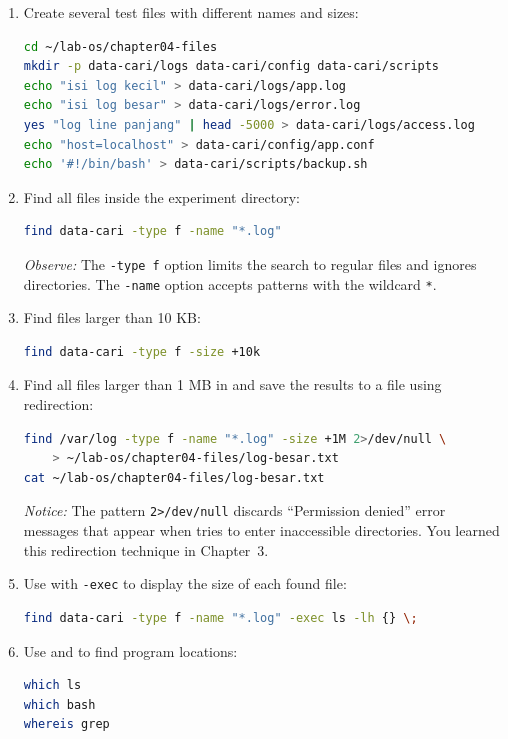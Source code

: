 \begin{enumerate}
    \item Create several test files with different names and sizes:
\begin{lstlisting}[language=bash, caption={Creating test files for search}]
cd ~/lab-os/chapter04-files
mkdir -p data-cari/logs data-cari/config data-cari/scripts
echo "isi log kecil" > data-cari/logs/app.log
echo "isi log besar" > data-cari/logs/error.log
yes "log line panjang" | head -5000 > data-cari/logs/access.log
echo "host=localhost" > data-cari/config/app.conf
echo '#!/bin/bash' > data-cari/scripts/backup.sh
\end{lstlisting}

    \item Find all  files inside the experiment directory:
\begin{lstlisting}[language=bash, caption={Searching for files by name}]
find data-cari -type f -name "*.log"
\end{lstlisting}
    \textit{Observe:} The \texttt{-type f} option limits the search to regular files and ignores directories. The \texttt{-name} option accepts patterns with the wildcard \texttt{*}.

    \item Find files larger than 10 KB:
\begin{lstlisting}[language=bash, caption={Searching for files by size}]
find data-cari -type f -size +10k
\end{lstlisting}

    \item Find all  files larger than 1 MB in  and save the results to a file using redirection:
\begin{lstlisting}[language=bash, caption={Finding large logs and saving results}]
find /var/log -type f -name "*.log" -size +1M 2>/dev/null \
    > ~/lab-os/chapter04-files/log-besar.txt
cat ~/lab-os/chapter04-files/log-besar.txt
\end{lstlisting}
    \textit{Notice:} The pattern \texttt{2>/dev/null} discards ``Permission denied'' error messages that appear when  tries to enter inaccessible directories. You learned this redirection technique in Chapter~3.

    \item Use  with \texttt{-exec} to display the size of each found file:
\begin{lstlisting}[language=bash, caption={Running a command on each found file}]
find data-cari -type f -name "*.log" -exec ls -lh {} \;
\end{lstlisting}

    \item Use  and  to find program locations:
\begin{lstlisting}[language=bash, caption={Finding program locations}]
which ls
which bash
whereis grep
\end{lstlisting}
\end{enumerate}

